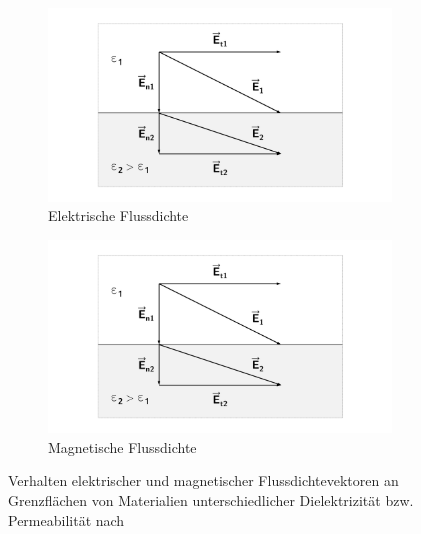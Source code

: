 \begin{figure}[ht]
    \centering
    \begin{subfigure}[b]{0.4\textwidth}
        \includegraphics[page = 3, width=\textwidth, trim = 4.8cm 1cm 4.8cm 1cm, clip]{Abbildungen/Kapitel2/Feldvektoren_an_Grenzflaechen.pdf}
        \caption{Elektrische Flussdichte}\label{subfig:2_Elektrische_Flussdichte_an_Grenzflaeche}
    \end{subfigure}
    \hspace{2cm}
    \begin{subfigure}[b]{0.4\textwidth}
        \includegraphics[page = 4, width=\textwidth, trim = 4.8cm 1cm 4.8cm 1cm, clip]{Abbildungen/Kapitel2/Feldvektoren_an_Grenzflaechen.pdf}
        \caption{Magnetische Flussdichte}\label{subfig:2_Magnetische_Flussdichte_an_Grenzflaeche}
    \end{subfigure}
    \caption[Verhalten elektrischer und magnetischer Flussdichtevektoren an Grenzflächen]{Verhalten elektrischer und magnetischer Flussdichtevektoren an Grenzflächen von \mbox{Materialien} unterschiedlicher Dielektrizität bzw. Permeabilität nach~\cite{EM_Schirmung}}
    \label{fig:2_Flussdichten_an_Grenzflaechen}
\end{figure}

